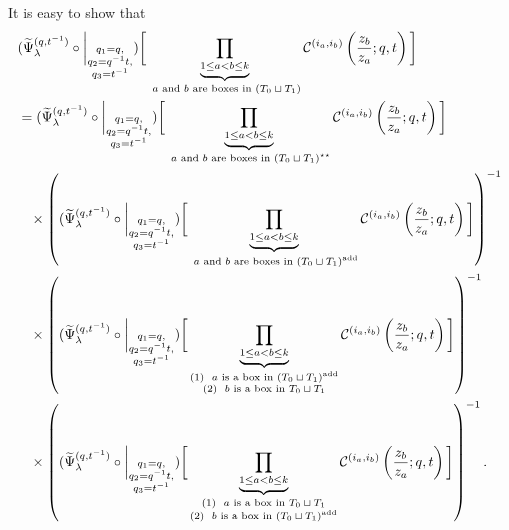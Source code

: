 \documentclass[12pt,reqno,a4paper]{amsart}
\newcommand{\comp}{\circ}
\newcommand{\cals}[1]{\mathcal{#1}}
\numberwithin{equation}{section}
\theoremstyle{definition}
\begin{document}
It is easy to show that 
\footnotesize
\begin{align}
	&(
	\widetilde{\Psi}_{\lambda}^{(q,t^{-1})}
	\comp 
	\bigg|_{
		\substack{
			q_1 = q, \\
			q_2 = q^{-1}t,\\
			q_3 = t^{-1} \\
		}
	}
	)
	\bigg[
	\underbrace{	\prod_{1 \leq a < b \leq k}				}_{\text{ $a$ and $b$ are boxes in $(T_0 \sqcup T_1)$}}
	\cals{C}^{(i_a,i_b)}\left(
	\frac{z_b}{z_a}
	; q, t
	\right)
	\bigg]
	\label{eqn316-1129-27jul}
	\\
	&= 
	(
	\widetilde{\Psi}_{\lambda}^{(q,t^{-1})}
	\comp 
	\bigg|_{
		\substack{
			q_1 = q, \\
			q_2 = q^{-1}t,\\
			q_3 = t^{-1} \\
		}
	}
	)
	\bigg[
	\underbrace{	\prod_{1 \leq a < b \leq k}				}_{\text{ $a$ and $b$ are boxes in $(T_0 \sqcup T_1)^{\star\star}$}}
	\cals{C}^{(i_a,i_b)}\left(
	\frac{z_b}{z_a}
	; q, t
	\right)
	\bigg]
\notag 
	\\
	&\hspace{0.3cm}\times
	\left(
	(
	\widetilde{\Psi}_{\lambda}^{(q,t^{-1})}
	\comp 
	\bigg|_{
		\substack{
			q_1 = q, \\
			q_2 = q^{-1}t,\\
			q_3 = t^{-1} \\
		}
	}
	)
	\bigg[
	\underbrace{	\prod_{1 \leq a < b \leq k}				}_{\text{ $a$ and $b$ are boxes in $(T_0 \sqcup T_1)^{\operatorname{add}}$}}
	\cals{C}^{(i_a,i_b)}\left(
	\frac{z_b}{z_a}
	; q, t
	\right)
	\bigg]
	\right)^{-1}
\notag 
	\\
	&\hspace{0.3cm}\times
	\left(
	(
	\widetilde{\Psi}_{\lambda}^{(q,t^{-1})}
	\comp 
	\bigg|_{
		\substack{
			q_1 = q, \\
			q_2 = q^{-1}t,\\
			q_3 = t^{-1} \\
		}
	}
	)
	\bigg[
	\underbrace{	\prod_{1 \leq a < b \leq k}				}_{
		\substack{
			(1) \,\, \text{ $a$ is a box in $(T_0 \sqcup T_1)^{\operatorname{add}}$}
			\\
			(2) \,\, \text{ $b$ is a box in $T_0 \sqcup T_1$}
		}
	}
	\cals{C}^{(i_a,i_b)}\left(
	\frac{z_b}{z_a}
	; q, t
	\right)
	\bigg]
	\right)^{-1}
	\notag 
	\\
	&\hspace{0.3cm}\times
	\left(
	(
	\widetilde{\Psi}_{\lambda}^{(q,t^{-1})}
	\comp 
	\bigg|_{
		\substack{
			q_1 = q, \\
			q_2 = q^{-1}t,\\
			q_3 = t^{-1} \\
		}
	}
	)
	\bigg[
	\underbrace{	\prod_{1 \leq a < b \leq k}				}_{
		\substack{
			(1) \,\, \text{ $a$ is a box in $T_0 \sqcup T_1$}
			\\
			(2) \,\, \text{ $b$ is a box in $(T_0 \sqcup T_1)^{\operatorname{add}}$}
		}
	}
	\cals{C}^{(i_a,i_b)}\left(
	\frac{z_b}{z_a}
	; q, t
	\right)
	\bigg]
	\right)^{-1}.
	\notag
\end{align}
\normalsize
\end{document}
